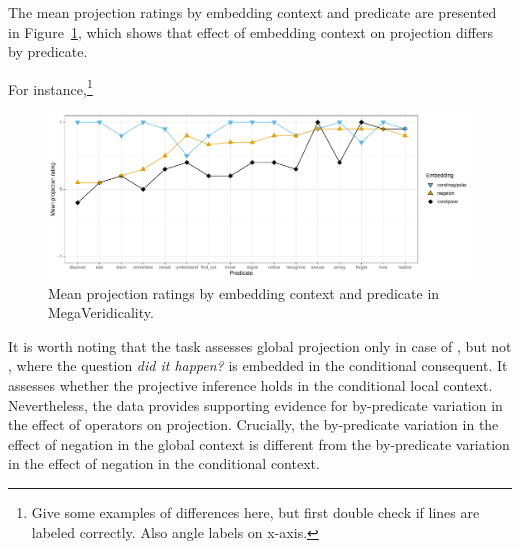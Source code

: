 \documentclass[a4paper,12pt,twoside]{article}
\begin{document}

			The mean projection ratings by embedding context and predicate are presented in Figure~\ref{fig:figure4}, which shows that effect of embedding context on projection differs by predicate.

			For instance,\footnote{Give some examples of differences here, but first double check if lines are labeled correctly. Also angle labels on x-axis.}


			\begin{figure}[ht]
				\centering
				\includegraphics[width = \linewidth]{mega-veridicality}
				\caption{Mean projection ratings by embedding context and predicate in MegaVeridicality.}
				\label{fig:figure4}
			\end{figure}

			It is worth noting that the task assesses global projection only in case of \Last[a], but not \Last[b+c], where the question \textit{did it happen?} is embedded in the conditional consequent. It assesses whether the projective inference holds in the conditional local context. Nevertheless, the data provides supporting evidence for by-predicate variation in the effect of operators on projection. Crucially, the by-predicate variation in the effect of negation in the global context is different from the by-predicate variation in the effect of negation in the conditional context.
\end{document}
